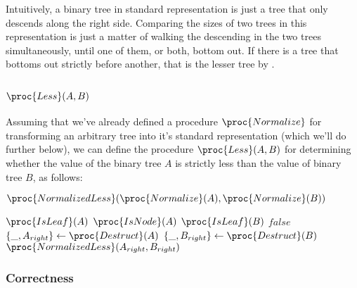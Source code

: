 Intuitively, a binary tree in standard representation is just a tree that only
descends along the right side. Comparing the sizes of two trees in this
representation is just a matter of walking the descending in the two trees
simultaneously, until one of them, or both, bottom out. If there is a tree that
bottoms out strictly before another, that is the lesser tree by
.

\subsection{$\proc{Less}(A,B)$}

Assuming that we've already defined a procedure $\proc{Normalize}$ for
transforming an arbitrary tree into it's standard representation (which we'll
do further below), we can define the procedure $\proc{Less}(A,B)$ for
determining whether the value of the binary tree $A$ is strictly less than the
value of binary tree $B$, as follows:

\begin{codebox}
\li $\proc{NormalizedLess}(\proc{Normalize}(A),\proc{Normalize}(B))$
\end{codebox}

\begin{codebox}
\li \If $\proc{IsLeaf}(A)$ \Then\label{normalized-less-init-start}
\li   \Return $\proc{IsNode}(A)$
    \End
\li \If $\proc{IsLeaf}(B)$ \Then
\li   \Return $false$
    \End\label{normalized-less-init-end}
\zi
\li $\{\_, A_{right}\} \gets \proc{Destruct}(A)$
\li $\{\_, B_{right}\} \gets \proc{Destruct}(B)$
\zi
\li \Return $\proc{NormalizedLess}(A_{right},B_{right})$
\end{codebox}

\subsubsection{Correctness}

